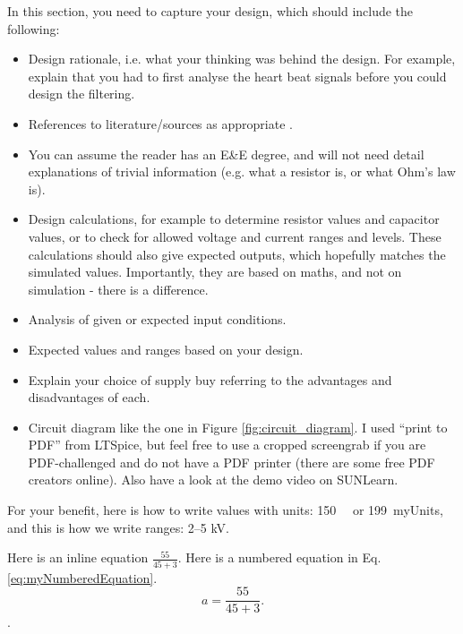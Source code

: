 {In this section, you need to capture your design, which should include the following: 
\begin{itemize}
  \item Design rationale, i.e. what your thinking was behind the design. For example, explain that you had to first analyse the heart beat signals before you could design the filtering. 
  \item References to literature/sources as appropriate \cite{WebsiteOpAmp}.  
  \item You can assume the reader has an E\&E degree, and will not need detail explanations of trivial information (e.g. what a resistor is, or what Ohm's law is).  
  \item Design calculations, for example to determine resistor values and capacitor values, or to check for allowed voltage and current ranges and levels. These calculations should also give expected outputs, which hopefully matches the simulated values. Importantly, they are based on maths, and not on simulation - there is a difference. 
  \item Analysis of given or expected input conditions. 
  \item Expected values and ranges based on your design. 
  \item Explain your choice of supply buy referring to the advantages and disadvantages of each. 
  \item Circuit diagram like the one in Figure \ref{fig:circuit_diagram}. I used ``print to PDF'' from LTSpice,  but feel free to use a cropped screengrab if you are PDF-challenged and do not have a PDF printer (there are some free PDF creators online). Also have a look at the demo video on SUNLearn. 
\end{itemize}

For your benefit, here is how to write values with units: \SI{150}{\milli\Omega} or \SI{199}{myUnits}, and this is how we write ranges: \numrange{2}{5} \si{\kilo\volt}.

Here is an inline equation $ \frac{55}{45+3}$. Here is a numbered equation in Eq. \ref{eq:myNumberedEquation}.
\begin{equation}
   a = \frac{55}{45+3}
   \label{eq:myNumberedEquation}. 
\end{equation}. 

}
